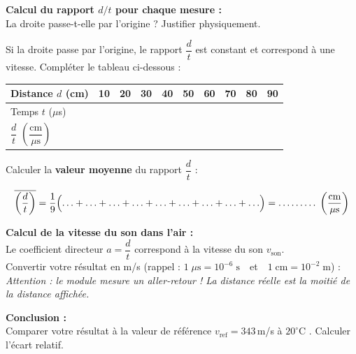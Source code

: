 \documentclass[11pt,a4paper]{article}
\newcommand{\cadreblanc}[1]{%
\medskip\framebox[\linewidth][c]{%
\rule{0mm}{#1mm}}\par
\medskip}
\renewcommand{\arraystretch}{3}
\begin{document}
\vspace{2mm}

\newpage
 \textbf{Calcul du rapport $d/t$ pour chaque mesure :}\\[3mm]
 
La droite passe-t-elle par l'origine ? Justifier physiquement.
 
\cadreblanc{12}
 
Si la droite passe par l'origine, le rapport $\dfrac{d}{t}$ est constant et correspond à une vitesse.
Compléter le tableau ci-dessous :
 
\vspace{3mm}
\begin{center}
\renewcommand{\arraystretch}{2.5}
\begin{tabular}{|L{3cm}|C{1cm}|C{1cm}|C{1cm}|C{1cm}|C{1cm}|C{1cm}|C{1cm}|C{1cm}|C{1cm}|}
\hline
Distance $d$ (cm) & 10 & 20 & 30 & 40 & 50 & 60 & 70 & 80 & 90 \\
\hline
Temps $t$ ($\mu$s) & & & & & & & & & \\
\hline
$\dfrac{d}{t}$ $\left(\dfrac{\text{cm}}{\mu\text{s}}\right)$ & & & & & & & & & \\
\hline
\end{tabular}
\end{center}
 
\vspace{5mm}
 
Calculer la \textbf{valeur moyenne} du rapport $\dfrac{d}{t}$ :
 
\[
  \overline{\left(\frac{d}{t}\right)}
  = \frac{1}{9}\Bigl( \ldots + \ldots + \ldots + \ldots + \ldots + \ldots + \ldots + \ldots + \ldots \Bigr)
  = \ldots\ldots\ldots\;\left(\frac{\text{cm}}{\mu\text{s}}\right)
\]
 
\vfill
 
 \textbf{Calcul de la vitesse du son dans l'air :}\\[3mm]
 
Le coefficient directeur $a = \dfrac{d}{t}$ correspond à la vitesse du son $v_{\text{son}}$.\\[3mm]
Convertir votre résultat en m/s
(rappel : $1\;\mu\text{s} = 10^{-6}\;\text{s}$~~et~~$1\;\text{cm} = 10^{-2}\;\text{m}$) :\\[3mm]
\textit{Attention : le module mesure un aller-retour ! La distance réelle est la moitié de la distance affichée.}
 
\cadreblanc{22}
 
\vfill
 
 \textbf{Conclusion :}\\[2mm]
Comparer votre résultat à la valeur de référence $v_{\text{ref}} = 343$\,m/s à $20^\circ\text{C}$ . Calculer l'écart relatif.
 
\cadreblanc{16}

\vfill 
 
\end{document}
